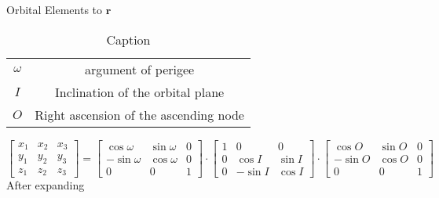\documentclass[aspectratio=169]{beamer}
\begin{document}
\begin{frame}{Orbital Elements to $\mathbf{r}$}
\begin{table}
    \centering
    \begin{tabular}{c|c}
        $\omega$ &  argument of perigee \\
        $I$ & Inclination of the orbital plane \\
        $O$ & Right ascension of the ascending node
    \end{tabular}
    \caption{Caption}
    \label{tab:my_label}
\end{table}
$\begin{bmatrix} 
x_1 & x_2 & x_3 \\
y_1 & y_2 & y_3 \\
z_1 & z_2 & z_3
\end{bmatrix} = 
\begin{bmatrix}
\cos \omega & \sin \omega & 0 \\
-\sin \omega & \cos \omega & 0 \\
0 & 0 & 1
\end{bmatrix} \cdot
\begin{bmatrix}
1 & 0 & 0 \\
0 & \cos I & \sin I \\
0 & -\sin I & \cos I
\end{bmatrix} \cdot
\begin{bmatrix}
\cos O & \sin O & 0 \\
-\sin O & \cos O & 0 \\
0 & 0 & 1
\end{bmatrix}
$
After expanding
\end{frame}

\end{document}
